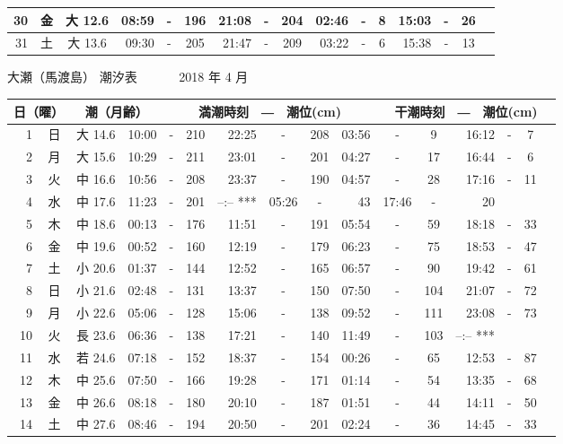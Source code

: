 \documentclass[12pt.a4j]{jsarticle}
\begin{document}
\begin{center}
\begin{table}[ht]
\begin{tabular}{|rc|cr|ccrccr|ccrccr|}
\hline
30 & 金 & 大 12.6 & 08:59 &-& 196 & 21:08 &-& 204 & 02:46 &-&   8 & 15:03 &-&  26 \\
\hline
31 & 土 & 大 13.6 & 09:30 &-& 205 & 21:47 &-& 209 & 03:22 &-&   6 & 15:38 &-&  13 \\
\hline
\end{tabular}
\end{table}
\newpage
 {\LARGE 大瀬（馬渡島）  潮汐表　　　}
 {\large 2018 年  4 月}\\
 \begin{table}[ht]
 \begin{tabular}{|rc|cr|ccrccr|ccrccr|}
 \hline
 \multicolumn{2}{|c|}{日（曜）} & \multicolumn{2}{c|}{潮（月齢）} & \multicolumn{6}{c|}{満潮時刻　―　潮位(cm)} & \multicolumn{6}{c|}{干潮時刻　―　潮位(cm)} \\
 \hline
 1 & 日 & 大 14.6 & 10:00 &-& 210 & 22:25 &-& 208 & 03:56 &-&   9 & 16:12 &-&   7 \\
\hline
 2 & 月 & 大 15.6 & 10:29 &-& 211 & 23:01 &-& 201 & 04:27 &-&  17 & 16:44 &-&   6 \\
\hline
 3 & 火 & 中 16.6 & 10:56 &-& 208 & 23:37 &-& 190 & 04:57 &-&  28 & 17:16 &-&  11 \\
\hline
 4 & 水 & 中 17.6 & 11:23 &-& 201 & --:--   *** & 05:26 &-&  43 & 17:46 &-&  20 \\
\hline
 5 & 木 & 中 18.6 & 00:13 &-& 176 & 11:51 &-& 191 & 05:54 &-&  59 & 18:18 &-&  33 \\
\hline
 6 & 金 & 中 19.6 & 00:52 &-& 160 & 12:19 &-& 179 & 06:23 &-&  75 & 18:53 &-&  47 \\
\hline
 7 & 土 & 小 20.6 & 01:37 &-& 144 & 12:52 &-& 165 & 06:57 &-&  90 & 19:42 &-&  61 \\
\hline
 8 & 日 & 小 21.6 & 02:48 &-& 131 & 13:37 &-& 150 & 07:50 &-& 104 & 21:07 &-&  72 \\
\hline
 9 & 月 & 小 22.6 & 05:06 &-& 128 & 15:06 &-& 138 & 09:52 &-& 111 & 23:08 &-&  73 \\
\hline
10 & 火 & 長 23.6 & 06:36 &-& 138 & 17:21 &-& 140 & 11:49 &-& 103 & --:--   *** \\
\hline
11 & 水 & 若 24.6 & 07:18 &-& 152 & 18:37 &-& 154 & 00:26 &-&  65 & 12:53 &-&  87 \\
\hline
12 & 木 & 中 25.6 & 07:50 &-& 166 & 19:28 &-& 171 & 01:14 &-&  54 & 13:35 &-&  68 \\
\hline
13 & 金 & 中 26.6 & 08:18 &-& 180 & 20:10 &-& 187 & 01:51 &-&  44 & 14:11 &-&  50 \\
\hline
14 & 土 & 中 27.6 & 08:46 &-& 194 & 20:50 &-& 201 & 02:24 &-&  36 & 14:45 &-&  33 \\

\end{tabular}
\end{table}
\end{center}
\end{document}
